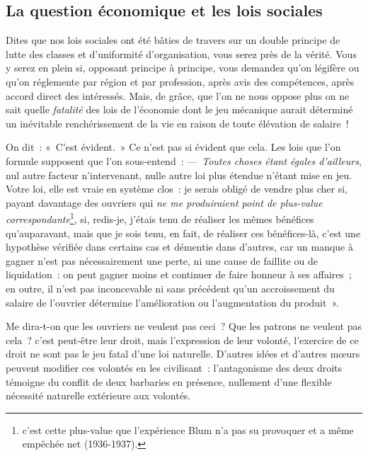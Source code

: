 \documentclass[french,twoside]{book} %
\newcommand{\astermono}{\medskip\centerline{\color{rubric}\large\selectfont{\syms ✻}}\medskip\par}%
\begin{document}
\subsection[{La question économique et les lois sociales}]{La question économique et les lois sociales}
\noindent Dites que nos lois sociales ont été bâties de travers sur un double principe de lutte des classes et d’uniformité d’organisation, vous serez près de la vérité. Vous y serez en plein si, opposant principe à principe, vous demandez qu’on légifère ou qu’on réglemente par région et par profession, après avis des compétences, après accord direct des intéressés. Mais, de grâce, que l’on ne nous oppose plus on ne sait quelle \emph{fatalité} des lois de l’économie dont le jeu mécanique aurait déterminé un inévitable renchérissement de la vie en raison de toute élévation de salaire !\par
On dit : « C’est évident. » Ce n’est pas si évident que cela. Les lois que l’on formule supposent que l’on sous-entend : — \emph{Toutes choses étant égales d’ailleurs}, nul autre facteur n’intervenant, nulle autre loi plus étendue n’étant mise en jeu. Votre loi, elle est vraie en système clos : je serais obligé de vendre plus cher si, payant davantage des ouvriers qui \emph{ne me produiraient point de plus-value correspondante}\footnote{c’est cette plus-value que l’expérience Blum n’a pas su provoquer et a même empêchée net (1936-1937).}, si, redis-je, j’étais tenu de réaliser les mêmes bénéfices qu’auparavant, mais que je sois tenu, en fait, de réaliser ces bénéfices-là, c’est une hypothèse vérifiée dans certains cas et démentie dans d’autres, car un manque à gagner n’est pas nécessairement une perte, ni une cause de faillite ou de liquidation : on peut gagner moins et continuer de faire honneur à ses affaires ; en outre, il n’est pas inconcevable ni sans précédent qu’un accroissement du salaire de l’ouvrier détermine l’amélioration ou l’augmentation du produit ».\par
Me dira-t-on que les ouvriers ne veulent pas ceci ? Que les patrons ne veulent pas cela ? c’est peut-être leur droit, mais l’expression de leur volonté, l’exercice de ce droit ne sont pas le jeu fatal d’une loi naturelle. D’autres idées et d’autres mœurs peuvent modifier ces volontés en les civilisant : l’antagonisme des deux droits témoigne du conflit de deux barbaries en présence, nullement d’une flexible nécessité naturelle extérieure aux volontés.\par

\astermono
\end{document}
